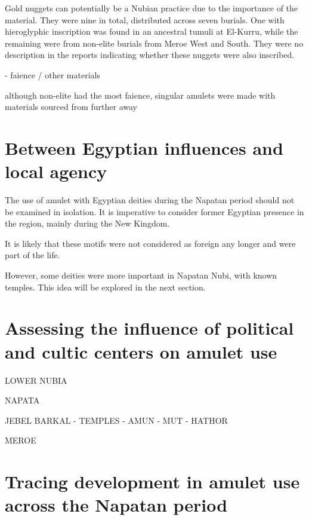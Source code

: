 Gold nuggets can potentially be a Nubian practice due to the importance of the material. They were nine in total, distributed across seven burials. One with hieroglyphic inscription was found in an ancestral tumuli at El-Kurru, while the remaining were from non-elite burials from Meroe West and South. They were no description in the reports indicating whether these nuggets were also inscribed.



- faience / other materials

although non-elite had the most faience, singular amulets were made with materials sourced from further away




\section{Between Egyptian influences and local agency}




The use of amulet with Egyptian deities during the Napatan period should not be examined in isolation. It is imperative to consider former Egyptian presence in the region, mainly during the New Kingdom.

It is likely that these motifs were not considered as foreign any longer and were part of the life.

However, some deities were more important in Napatan Nubi, with known temples. This idea will be explored in the next section.



\section{Assessing the influence of political and cultic centers on amulet use}

LOWER NUBIA

NAPATA

JEBEL BARKAL - TEMPLES - AMUN - MUT - HATHOR

MEROE



\section{Tracing development in amulet use across the Napatan period}
